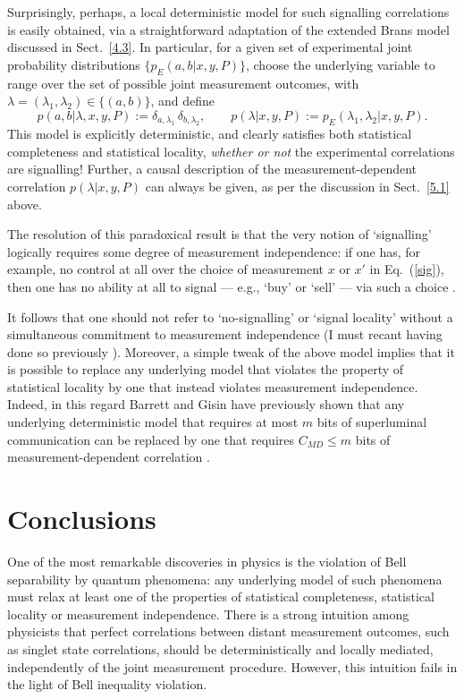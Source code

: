 \documentclass[graybox]{svmult}
\begin{document}
{Surprisingly, perhaps, a local deterministic model for such signalling correlations is easily obtained, via a straightforward adaptation of the extended Brans model discussed in Sect.~\ref{4.3}. In particular, for a given set of experimental joint probability distributions $\{p_E(a,b|x,y,P)\}$, choose the underlying variable to range over the set of possible joint measurement outcomes, with  $\lambda=(\lambda_1,\lambda_2)\in \{(a,b)\}$, and define
\begin{equation}
p(a,b|\lambda,x,y,P) :=\delta_{a,\lambda_1} \, \delta_{b,\lambda_2},\qquad p(\lambda|x,y,P):= p_E(\lambda_1,\lambda_2|x,y,P).
\end{equation}
This model is explicitly deterministic, and clearly satisfies both statistical completeness and statistical locality, {\it whether or not} the experimental correlations are signalling!  Further, a causal description of the measurement-dependent correlation $p(\lambda|x,y,P)$ can always be given, as per the discussion in Sect.~\ref{5.1} above.

The resolution of this paradoxical result is that the very notion of `signalling' logically requires some degree of measurement independence: if one has, for example, no control at all over the choice of measurement $x$ or $x'$ in Eq.~(\ref{sig}), then one has no ability at all to signal --- e.g., `buy' or `sell' --- via such a choice \cite{scarani}.  

It follows that one should not refer to `no-signalling' or `signal locality' without a simultaneous commitment to measurement independence (I must recant having done so previously \cite{relaxed}).  Moreover, a simple tweak of the above model implies that it is possible to replace  any underlying model that violates the property of statistical locality by one that instead violates measurement independence.  Indeed, in this regard Barrett and Gisin have previously shown that any underlying deterministic model that requires at most $m$ bits of superluminal communication can be replaced by one that requires $C_{MD}\leq m$ bits of measurement-dependent correlation \cite{bg}.

\section{Conclusions}

One of the most remarkable discoveries in physics is the violation of Bell separability by quantum phenomena: any underlying model of such phenomena must relax at least one of the properties of statistical completeness, statistical locality or measurement independence.  There is a strong intuition among physicists that perfect correlations between distant measurement outcomes, such as singlet state correlations, should be deterministically and locally mediated, independently of the joint measurement procedure. However, this intuition fails in the light of Bell inequality violation.  

}
\end{document}
